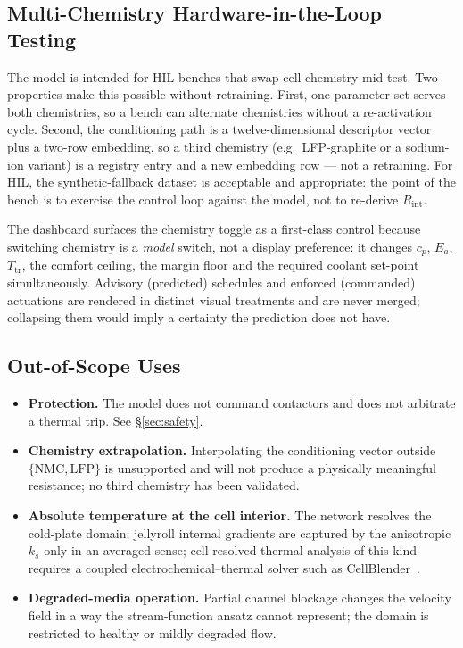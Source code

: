 \documentclass[journal,10pt,compsoc,onecolumn]{IEEEtran}
\begin{document}
\subsection{Multi-Chemistry Hardware-in-the-Loop Testing}

\noindent
The model is intended for HIL benches that swap cell chemistry mid-test. Two
properties make this possible without retraining. First, one parameter set
serves both chemistries, so a bench can alternate chemistries without a
re-activation cycle. Second, the conditioning path is a twelve-dimensional
descriptor vector plus a two-row embedding, so a third chemistry (e.g.\ LFP-graphite
or a sodium-ion variant) is a registry entry and a new embedding row --- not a
retraining. For HIL, the synthetic-fallback dataset is acceptable and
appropriate: the point of the bench is to exercise the control loop against the
model, not to re-derive $R_{\mathrm{int}}$.

\noindent
The dashboard surfaces the chemistry toggle as a first-class control because
switching chemistry is a \emph{model} switch, not a display preference: it
changes $c_p$, $E_a$, $T_{\mathrm{tr}}$, the comfort ceiling, the margin floor
and the required coolant set-point simultaneously. Advisory (predicted)
schedules and enforced (commanded) actuations are rendered in distinct visual
treatments and are never merged; collapsing them would imply a certainty the
prediction does not have.

\subsection{Out-of-Scope Uses}
\label{sec:intended-oos}

\begin{itemize}[leftmargin=1.4em,itemsep=2pt,topsep=3pt]
\item \textbf{Protection.} The model does not command contactors and does not
      arbitrate a thermal trip. See \S\ref{sec:safety}.
\item \textbf{Chemistry extrapolation.} Interpolating the conditioning vector
      outside $\{\mathrm{NMC},\mathrm{LFP}\}$ is unsupported and will not
      produce a physically meaningful resistance; no third chemistry has been
      validated.
\item \textbf{Absolute temperature at the cell interior.} The network resolves
      the cold-plate domain; jellyroll internal gradients are captured by the
      anisotropic $k_s$ only in an averaged sense; cell-resolved thermal
      analysis of this kind requires a coupled electrochemical--thermal solver
      such as CellBlender~\cite{prudhomme2024}.
\item \textbf{Degraded-media operation.} Partial channel blockage changes the
      velocity field in a way the stream-function ansatz cannot represent; the
      domain is restricted to healthy or mildly degraded flow.
\end{itemize}
\end{document}
